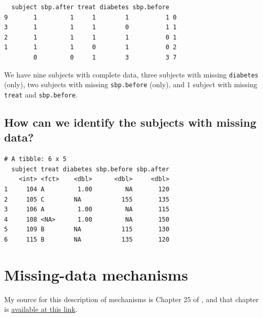 \documentclass[]{book}
\newenvironment{Shaded}{\begin{snugshade}}{\end{snugshade}}
\newcommand{\KeywordTok}[1]{\textcolor[rgb]{0.13,0.29,0.53}{\textbf{#1}}}
\newcommand{\StringTok}[1]{\textcolor[rgb]{0.31,0.60,0.02}{#1}}
\newcommand{\OperatorTok}[1]{\textcolor[rgb]{0.81,0.36,0.00}{\textbf{#1}}}
\newcommand{\NormalTok}[1]{#1}
\theoremstyle{definition}
\theoremstyle{definition}
\theoremstyle{definition}
\theoremstyle{remark}
\begin{document}
\begin{verbatim}
  subject sbp.after treat diabetes sbp.before  
9       1         1     1        1          1 0
3       1         1     1        0          1 1
2       1         1     1        1          0 1
1       1         1     0        1          0 2
        0         0     1        3          3 7
\end{verbatim}

We have nine subjects with complete data, three subjects with missing
\texttt{diabetes} (only), two subjects with missing \texttt{sbp.before}
(only), and 1 subject with missing \texttt{treat} and
\texttt{sbp.before}.

\subsection{How can we identify the subjects with missing
data?}\label{how-can-we-identify-the-subjects-with-missing-data}

\begin{Shaded}
\end{Shaded}

\begin{verbatim}
# A tibble: 6 x 5
  subject treat diabetes sbp.before sbp.after
    <int> <fct>    <dbl>      <dbl>     <dbl>
1     104 A         1.00         NA       120
2     105 C        NA           155       135
3     106 A         1.00         NA       115
4     108 <NA>      1.00         NA       150
5     109 B        NA           115       130
6     115 B        NA           135       120
\end{verbatim}

\section{Missing-data mechanisms}\label{missing-data-mechanisms}

My source for this description of mechanisms is Chapter 25 of
\citet{GelmanHill2007}, and that chapter is
\href{http://www.stat.columbia.edu/~gelman/arm/missing.pdf}{available at
this link}.
\end{document}
